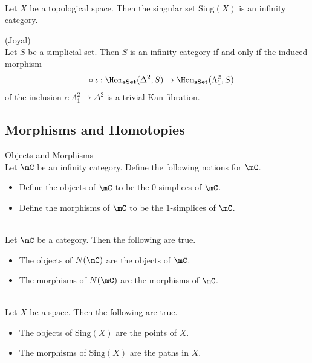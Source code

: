 \documentclass[a4paper]{article}
\begin{document}
\begin{lmm}{}{}\\
Let $X$ be a topological space. Then the singular set $\text{Sing}(X)$ is an infinity category. 
\end{lmm}

\begin{thm}{(Joyal)}{}\\ Let $S$ be a simplicial set. Then $S$ is an infinity category if and only if the induced morphism $$-\circ\iota:\Hom_\bold{sSet}(\Delta^2,S)\to\Hom_\bold{sSet}(\Lambda_1^2,S)$$ of the inclusion $\iota:\Lambda_1^2\to\Delta^2$ is a trivial Kan fibration. 
\end{thm}

\subsection{Morphisms and Homotopies}
\begin{defn}{Objects and Morphisms}{}\\ Let $\mC$ be an infinity category. Define the following notions for $\mC$. 
\begin{itemize}
\item Define the objects of $\mC$ to be the $0$-simplices of $\mC$. 
\item Define the morphisms of $\mC$ to be the $1$-simplices of $\mC$. 
\end{itemize}
\end{defn}

\begin{eg}{}{}\\
Let $\mC$ be a category. Then the following are true. 
\begin{itemize}
\item The objects of $N(\mC)$ are the objects of $\mC$. 
\item The morphisms of $N(\mC)$ are the morphisms of $\mC$. 
\end{itemize}
\end{eg}

\begin{eg}{}{}\\
Let $X$ be a space. Then the following are true. 
\begin{itemize}
\item The objects of $\text{Sing}(X)$ are the points of $X$. 
\item The morphisms of $\text{Sing}(X)$ are the paths in $X$. 
\end{itemize}
\end{eg}
\end{document}
